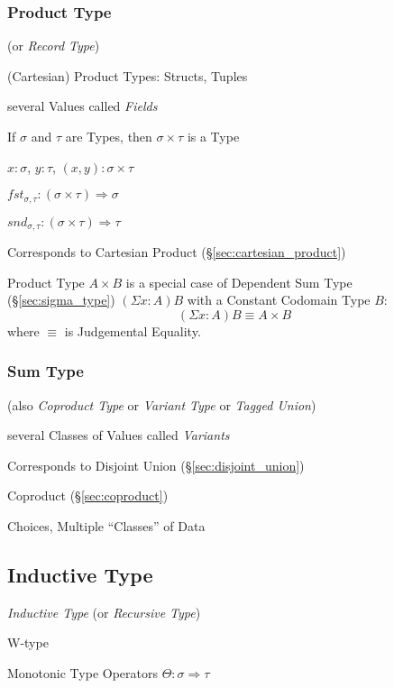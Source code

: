 \subsubsection{Product Type}\label{sec:product_type}

(or \emph{Record Type})

(Cartesian) Product Types: Structs, Tuples

several Values called \emph{Fields}

If $\sigma$ and $\tau$ are Types, then $\sigma \times \tau$ is a Type

$x : \sigma$, $y : \tau$, $(x,y) : \sigma \times \tau$

$fst_{\sigma,\tau} : (\sigma \times \tau) \Rightarrow \sigma$

$snd_{\sigma,\tau} : (\sigma \times \tau) \Rightarrow \tau$

Corresponds to Cartesian Product (\S\ref{sec:cartesian_product})

Product Type $A \times B$ is a special case of Dependent Sum Type
(\S\ref{sec:sigma_type}) $(\Sigma x:A)B$ with a Constant Codomain
Type $B$:
\[
  (\Sigma x:A) B \equiv A \times B
\]
where $\equiv$ is Judgemental Equality.



\subsubsection{Sum Type}\label{sec:sum_type}

(also \emph{Coproduct Type} or \emph{Variant Type} or \emph{Tagged
  Union})

several Classes of Values called \emph{Variants}

Corresponds to Disjoint Union (\S\ref{sec:disjoint_union})

Coproduct (\S\ref{sec:coproduct})

Choices, Multiple ``Classes'' of Data



\subsection{Inductive Type}\label{sec:inductive_type}

\emph{Inductive Type} (or \emph{Recursive Type})

W-type

Monotonic Type Operators $\Theta : \sigma \Rightarrow \tau$

